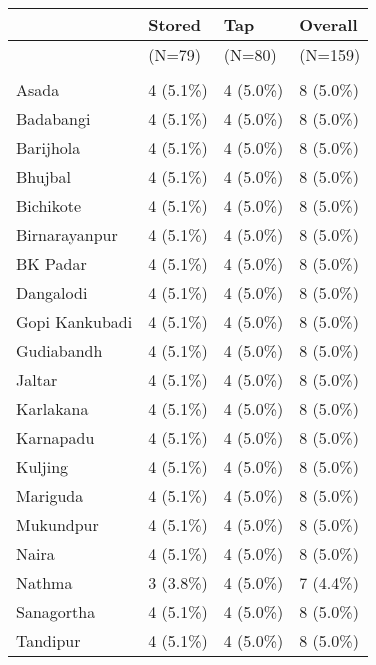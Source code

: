 \documentclass[
]{article}
\begin{document}
\begin{tabular}[t]{llll}
\toprule
  & Stored & Tap & Overall\\
\midrule
 & (N=79) & (N=80) & (N=159)\\
\addlinespace[0.3em]
\multicolumn{4}{l}{\textbf{R\_Cen\_village\_name\_str}}\\
\hspace{1em}Asada & 4 (5.1\%) & 4 (5.0\%) & 8 (5.0\%)\\
\hspace{1em}Badabangi & 4 (5.1\%) & 4 (5.0\%) & 8 (5.0\%)\\
\hspace{1em}Barijhola & 4 (5.1\%) & 4 (5.0\%) & 8 (5.0\%)\\
\hspace{1em}Bhujbal & 4 (5.1\%) & 4 (5.0\%) & 8 (5.0\%)\\
\hspace{1em}Bichikote & 4 (5.1\%) & 4 (5.0\%) & 8 (5.0\%)\\
\hspace{1em}Birnarayanpur & 4 (5.1\%) & 4 (5.0\%) & 8 (5.0\%)\\
\hspace{1em}BK Padar & 4 (5.1\%) & 4 (5.0\%) & 8 (5.0\%)\\
\hspace{1em}Dangalodi & 4 (5.1\%) & 4 (5.0\%) & 8 (5.0\%)\\
\hspace{1em}Gopi Kankubadi & 4 (5.1\%) & 4 (5.0\%) & 8 (5.0\%)\\
\hspace{1em}Gudiabandh & 4 (5.1\%) & 4 (5.0\%) & 8 (5.0\%)\\
\hspace{1em}Jaltar & 4 (5.1\%) & 4 (5.0\%) & 8 (5.0\%)\\
\hspace{1em}Karlakana & 4 (5.1\%) & 4 (5.0\%) & 8 (5.0\%)\\
\hspace{1em}Karnapadu & 4 (5.1\%) & 4 (5.0\%) & 8 (5.0\%)\\
\hspace{1em}Kuljing & 4 (5.1\%) & 4 (5.0\%) & 8 (5.0\%)\\
\hspace{1em}Mariguda & 4 (5.1\%) & 4 (5.0\%) & 8 (5.0\%)\\
\hspace{1em}Mukundpur & 4 (5.1\%) & 4 (5.0\%) & 8 (5.0\%)\\
\hspace{1em}Naira & 4 (5.1\%) & 4 (5.0\%) & 8 (5.0\%)\\
\hspace{1em}Nathma & 3 (3.8\%) & 4 (5.0\%) & 7 (4.4\%)\\
\hspace{1em}Sanagortha & 4 (5.1\%) & 4 (5.0\%) & 8 (5.0\%)\\
\hspace{1em}Tandipur & 4 (5.1\%) & 4 (5.0\%) & 8 (5.0\%)\\
\bottomrule
\end{tabular}
\end{document}
